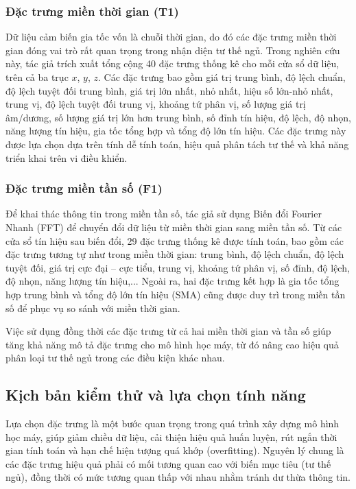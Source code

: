 \subsubsection{Đặc trưng miền thời gian (T1)}\label{AA}

Dữ liệu cảm biến gia tốc vốn là chuỗi thời gian, do đó các đặc trưng miền thời gian đóng vai trò rất quan trọng trong nhận diện tư thế ngủ. Trong nghiên cứu này, tác giả trích xuất tổng cộng 40 đặc trưng thống kê cho mỗi cửa sổ dữ liệu, trên cả ba trục $x$, $y$, $z$. Các đặc trưng bao gồm giá trị trung bình, độ lệch chuẩn, độ lệch tuyệt đối trung bình, giá trị lớn nhất, nhỏ nhất, hiệu số lớn-nhỏ nhất, trung vị, độ lệch tuyệt đối trung vị, khoảng tứ phân vị, số lượng giá trị âm/dương, số lượng giá trị lớn hơn trung bình, số đỉnh tín hiệu, độ lệch, độ nhọn, năng lượng tín hiệu, gia tốc tổng hợp và tổng độ lớn tín hiệu. Các đặc trưng này được lựa chọn dựa trên tính dễ tính toán, hiệu quả phân tách tư thế và khả năng triển khai trên vi điều khiển.

\subsubsection{Đặc trưng miền tần số (F1)}\label{AA}

Để khai thác thông tin trong miền tần số, tác giả sử dụng Biến đổi Fourier Nhanh (FFT) để chuyển đổi dữ liệu từ miền thời gian sang miền tần số. Từ các cửa sổ tín hiệu sau biến đổi, 29 đặc trưng thống kê được tính toán, bao gồm các đặc trưng tương tự như trong miền thời gian: trung bình, độ lệch chuẩn, độ lệch tuyệt đối, giá trị cực đại – cực tiểu, trung vị, khoảng tứ phân vị, số đỉnh, độ lệch, độ nhọn, năng lượng tín hiệu,... Ngoài ra, hai đặc trưng kết hợp là gia tốc tổng hợp trung bình và tổng độ lớn tín hiệu (SMA) cũng được duy trì trong miền tần số để phục vụ so sánh với miền thời gian.

Việc sử dụng đồng thời các đặc trưng từ cả hai miền thời gian và tần số giúp tăng khả năng mô tả đặc trưng cho mô hình học máy, từ đó nâng cao hiệu quả phân loại tư thế ngủ trong các điều kiện khác nhau.

\subsection{Kịch bản kiểm thử và lựa chọn tính năng}

Lựa chọn đặc trưng là một bước quan trọng trong quá trình xây dựng mô hình học máy, giúp giảm chiều dữ liệu, cải thiện hiệu quả huấn luyện, rút ngắn thời gian tính toán và hạn chế hiện tượng quá khớp (overfitting). Nguyên lý chung là các đặc trưng hiệu quả phải có mối tương quan cao với biến mục tiêu (tư thế ngủ), đồng thời có mức tương quan thấp với nhau nhằm tránh dư thừa thông tin.


